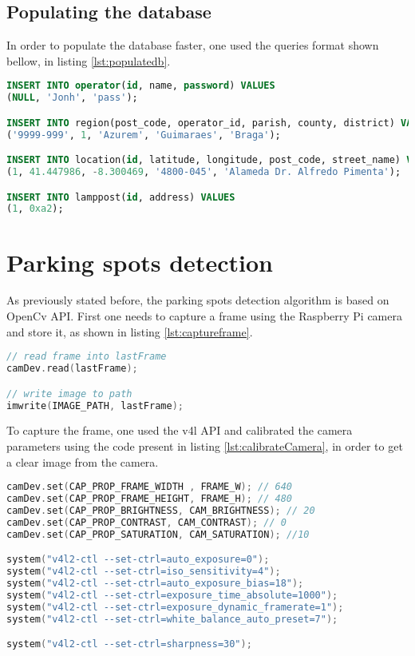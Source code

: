 \subsection{Populating the database}
In order to populate the database faster, one used the queries format shown bellow, in listing \ref{lst:populatedb}.

\begin{lstlisting}[language=SQL, caption={Queries examples to populate database.}, label={lst:populatedb}]
INSERT INTO operator(id, name, password) VALUES
(NULL, 'Jonh', 'pass');

INSERT INTO region(post_code, operator_id, parish, county, district) VALUES
('9999-999', 1, 'Azurem', 'Guimaraes', 'Braga');

INSERT INTO location(id, latitude, longitude, post_code, street_name) VALUES
(1, 41.447986, -8.300469, '4800-045', 'Alameda Dr. Alfredo Pimenta');

INSERT INTO lamppost(id, address) VALUES
(1, 0xa2);

\end{lstlisting}

\section{Parking spots detection}
As previously stated before, the parking spots detection algorithm is based on OpenCv API. First one needs to capture a frame using the Raspberry Pi camera and store it, as shown in listing \ref{lst:captureframe}. 

\begin{lstlisting}[language=C, caption={Capture and Store frame from Camera.}, label={lst:captureframe}]
// read frame into lastFrame
camDev.read(lastFrame);

// write image to path
imwrite(IMAGE_PATH, lastFrame);
\end{lstlisting}

To capture the frame, one used the \ac{v4l} API and calibrated the camera parameters using the code present in listing \ref{lst:calibrateCamera}, in order to get a clear image from the camera. 

\begin{lstlisting}[language=C, caption={Capture and Store frame from Camera.}, label={lst:calibrateCamera}]
camDev.set(CAP_PROP_FRAME_WIDTH , FRAME_W); // 640
camDev.set(CAP_PROP_FRAME_HEIGHT, FRAME_H); // 480
camDev.set(CAP_PROP_BRIGHTNESS, CAM_BRIGHTNESS); // 20
camDev.set(CAP_PROP_CONTRAST, CAM_CONTRAST); // 0
camDev.set(CAP_PROP_SATURATION, CAM_SATURATION); //10

system("v4l2-ctl --set-ctrl=auto_exposure=0");
system("v4l2-ctl --set-ctrl=iso_sensitivity=4");
system("v4l2-ctl --set-ctrl=auto_exposure_bias=18");
system("v4l2-ctl --set-ctrl=exposure_time_absolute=1000");
system("v4l2-ctl --set-ctrl=exposure_dynamic_framerate=1");
system("v4l2-ctl --set-ctrl=white_balance_auto_preset=7");

system("v4l2-ctl --set-ctrl=sharpness=30");
\end{lstlisting}

